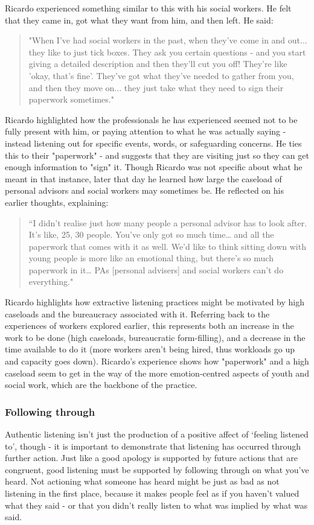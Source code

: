 Ricardo experienced something similar to this with his social workers. He felt that they came in, got what they want from him, and then left. He said:
\begin{quote}
"When I've had social workers in the past, when they've come in and out... they like to just tick boxes. They ask you certain questions - and you start giving a detailed description and then they'll cut you off! They're like 'okay, that's fine'. They've got what they've needed to gather from you, and then they move on... they just take what they need to sign their paperwork sometimes."
\end{quote}
Ricardo highlighted how the professionals he has experienced seemed not to be fully present with him, or paying attention to what he was actually saying - instead listening out for specific events, words, or safeguarding concerns. He ties this to their "paperwork" - and suggests that they are visiting just so they can get enough information to "sign" it. Though Ricardo was not specific about what he meant in that instance, later that day he learned how large the caseload of personal advisors and social workers may sometimes be. He reflected on his earlier thoughts, explaining:
\begin{quote}
“I didn’t realise just how many people a personal advisor has to look after. It’s like, 25, 30 people. You’ve only got so much time… and all the paperwork that comes with it as well. We’d like to think sitting down with young people is more like an emotional thing, but there’s so much paperwork in it… PAs [personal advisers] and social workers can’t do everything."
\end{quote}
Ricardo highlights how extractive listening practices might be motivated by high caseloads and the bureaucracy associated with it. Referring back to the experiences of workers explored earlier, this represents both an increase in the work to be done (high caseloads, bureaucratic form-filling), and a decrease in the time available to do it (more workers aren’t being hired, thus workloads go up and capacity goes down). Ricardo's experience shows how "paperwork" and a high caseload seem to get in the way of the more emotion-centred aspects of youth and social work, which are the backbone of the practice. 

\subsubsection{Following through}
Authentic listening isn’t just the production of a positive affect of ‘feeling listened to’, though - it is important to demonstrate that listening has occurred through further action. Just like a good apology is supported by future actions that are congruent, good listening must be supported by following through on what you’ve heard. Not actioning what someone has heard might be just as bad as not listening in the first place, because it makes people feel as if you haven't valued what they said - or that you didn't really listen to what was implied by what was said.

